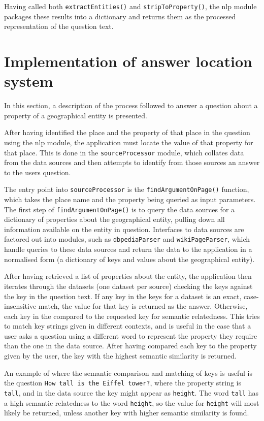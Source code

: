 \documentclass[authoryearcitations]{UoYCSproject}
\begin{document}
Having called both \texttt{extractEntities()} and \texttt{stripToProperty()}, the nlp module packages these results into a dictionary and returns them as the processed representation of the question text.

\section{Implementation of answer location system}
In this section, a description of the process followed to answer a question about a property of a geographical entity is presented. 

After having identified the place and the property of that place in the question using the nlp module, the application must locate the value of that property for that place. This is done in the \texttt{sourceProcessor} module, which collates data from the data sources and then attempts to identify from those sources an answer to the users question.

The entry point into \texttt{sourceProcessor} is the \texttt{findArgumentOnPage()} function, which takes the place name and the property being queried as input parameters. The first step of \texttt{findArgumentOnPage()} is to query the data sources for a dictionary of properties about the geographical entity, pulling down all information available on the entity in question. Interfaces to data sources are factored out into modules, such as \texttt{dbpediaParser} and \texttt{wikiPageParser}, which handle queries to these data sources and return the data to the application in a normalised form (a dictionary of keys and values about the geographical entity).

After having retrieved a list of properties about the entity, the application then iterates through the datasets (one dataset per source) checking the keys against the key in the question text. If any key in the keys for a dataset is an exact, case-insensitive match, the value for that key is returned as the answer. Otherwise, each key in the compared to the requested key for semantic relatedness. This tries to match key strings given in different contexts, and is useful in the case that a user asks a question using a different word to represent the property they require than the one in the data source. After having compared each key to the property given by the user, the key with the highest semantic similarity is returned. 

An example of where the semantic comparison and matching of keys is useful is the question \texttt{How tall is the Eiffel tower?}, where the property string is \texttt{tall}, and in the data source the key might appear as \texttt{height}. The word \texttt{tall} has a high semantic relatedness to the word \texttt{height}, so the value for \texttt{height} will most likely be returned, unless another key with higher semantic similarity is found.
\end{document}

